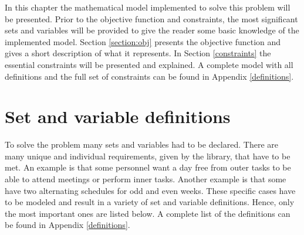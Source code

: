 In this chapter the mathematical model implemented to solve this problem will be presented. Prior to the objective function and constraints, the most significant sets and variables will be provided to give the reader some basic knowledge of the implemented model. Section \ref{section:obj} presents the objective function and gives a short description of what it represents. In Section \ref{constraints} the essential constraints will be presented and explained. A complete model with all definitions and the full set of constraints can be found in Appendix \ref{definitions}. %
\section{Set and variable definitions} \label{variables}
To solve the problem many sets and variables had to be declared. There are many unique and individual requirements, given by the library, that have to be met. An example is that some personnel want a day free from outer tasks to be able to attend meetings or perform inner tasks. Another example is that some have two alternating schedules for odd and even weeks. These specific cases have to be modeled and result in a variety of set and variable definitions. Hence, only the most important ones are listed below. A complete list of the definitions can be found in Appendix \ref{definitions}. \\
 \\
  \\
	 	\\
                  \\
	 \\
                            \\
	 \\
                    \\
                \\
               \\

